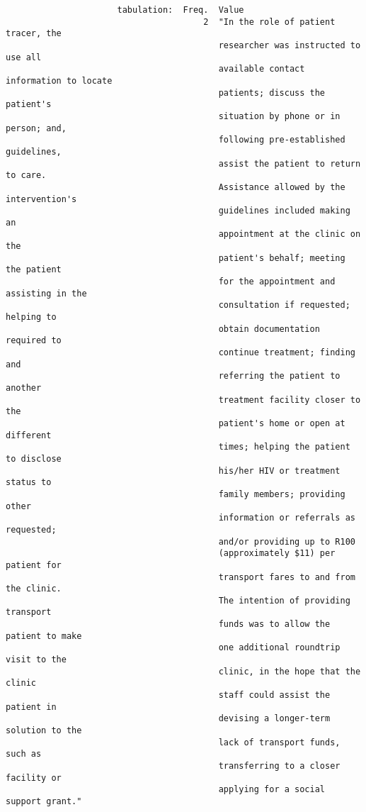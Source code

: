 \documentclass{article}
\begin{document}
\begin{verbatim}
                      tabulation:  Freq.  Value
                                       2  "In the role of patient tracer, the
                                          researcher was instructed to use all
                                          available contact information to locate
                                          patients; discuss the patient's
                                          situation by phone or in person; and,
                                          following pre-established guidelines,
                                          assist the patient to return to care.
                                          Assistance allowed by the intervention's
                                          guidelines included making an
                                          appointment at the clinic on the
                                          patient's behalf; meeting the patient
                                          for the appointment and assisting in the
                                          consultation if requested; helping to
                                          obtain documentation required to
                                          continue treatment; finding and
                                          referring the patient to another
                                          treatment facility closer to the
                                          patient's home or open at different
                                          times; helping the patient to disclose
                                          his/her HIV or treatment status to
                                          family members; providing other
                                          information or referrals as requested;
                                          and/or providing up to R100
                                          (approximately $11) per patient for
                                          transport fares to and from the clinic.
                                          The intention of providing transport
                                          funds was to allow the patient to make
                                          one additional roundtrip visit to the
                                          clinic, in the hope that the clinic
                                          staff could assist the patient in
                                          devising a longer-term solution to the
                                          lack of transport funds, such as
                                          transferring to a closer facility or
                                          applying for a social support grant."
          

\end{verbatim}
\end{document}
